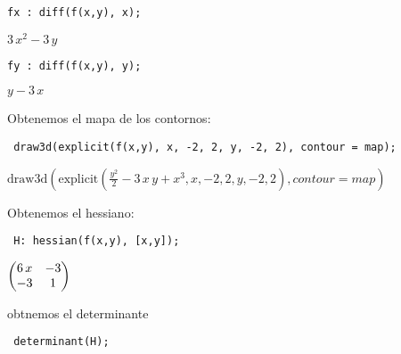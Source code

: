 \documentclass[12pt]{article}
\begin{document}
\noindent


\begin{verbatim}
fx : diff(f(x,y), x);
\end{verbatim}


\begin{math}
3\,{x}^{2}-3\,y
\end{math}


\noindent

\begin{verbatim}
fy : diff(f(x,y), y);
\end{verbatim}


\begin{math}
y-3\,x
\end{math}

Obtenemos el mapa de los contornos:


\noindent

\begin{verbatim}
 draw3d(explicit(f(x,y), x, -2, 2, y, -2, 2), contour = map);
\end{verbatim}
\begin{math}
\mathrm{draw3d}\left( \mathrm{explicit}\left( \frac{{y}^{2}}{2}-3\,x\,y+{x}^{3},x,-2,2,y,-2,2\right) ,contour=map\right) 
\end{math}

Obtenemos el hessiano:

\noindent

\begin{verbatim}
 H: hessian(f(x,y), [x,y]);
\end{verbatim}


\begin{math}
\begin{pmatrix}6\,x & -3\cr -3 & 1\end{pmatrix}
\end{math}

obtnemos el determinante

\noindent

\begin{verbatim}
 determinant(H);
\end{verbatim}

\end{document}
